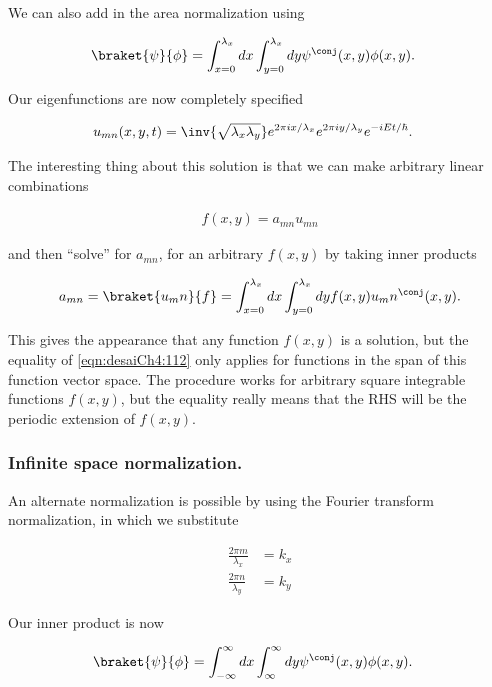 We can also add in the area normalization using 

\begin{align}\label{eqn:desaiCh4:110}
\braket{\psi}{\phi} &= 
\int_{x=0}^{\lambda_x} dx
\int_{y=0}^{\lambda_x} dy \psi^\conj(x,y) \phi(x,y).
\end{align}

Our eigenfunctions are now completely specified

\begin{align}\label{eqn:desaiCh4:111}
u_{mn}(x,y,t) &= \inv{\sqrt{\lambda_x \lambda_y}}
e^{2 \pi i x/\lambda_x}
e^{2 \pi i y/\lambda_y}
e^{-iE t/\hbar}.
\end{align}

The interesting thing about this solution is that we can make arbitrary linear combinations

\begin{align}\label{eqn:desaiCh4:112}
f(x,y) = a_{mn} u_{mn}
\end{align}

and then ``solve'' for $a_{mn}$, for an arbitrary $f(x,y)$ by taking inner products

\begin{align}\label{eqn:desaiCh4:113}
a_{mn} = \braket{u_mn}{f} =
\int_{x=0}^{\lambda_x} dx 
\int_{y=0}^{\lambda_x} dy f(x,y) u_mn^\conj(x,y).
\end{align}

This gives the appearance that any function $f(x,y)$ is a solution, but the equality of \ref{eqn:desaiCh4:112} only applies for functions in the span of this function vector space.  The procedure works for arbitrary square integrable functions $f(x,y)$, but the equality really means that the RHS will be the periodic extension of $f(x,y)$.

\subsubsection{Infinite space normalization.}

An alternate normalization is possible by using the Fourier transform normalization, in which we substitute 

\begin{align}\label{eqn:desaiCh4:114}
\frac{2 \pi m }{\lambda_x} &= k_x \\
\frac{2 \pi n }{\lambda_y} &= k_y 
\end{align}

Our inner product is now

\begin{align}\label{eqn:desaiCh4:115}
\braket{\psi}{\phi} &= 
\int_{-\infty}^{\infty} dx
\int_{\infty}^{\infty} dy \psi^\conj(x,y) \phi(x,y).
\end{align}

